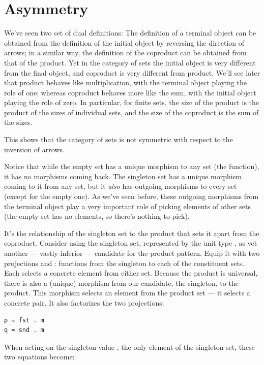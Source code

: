 \section{Asymmetry}\label{asymmetry}

We've seen two set of dual definitions: The definition of a terminal
object can be obtained from the definition of the initial object by
reversing the direction of arrows; in a similar way, the definition of
the coproduct can be obtained from that of the product. Yet in the
category of sets the initial object is very different from the final
object, and coproduct is very different from product. We'll see later
that product behaves like multiplication, with the terminal object
playing the role of one; whereas coproduct behaves more like the sum,
with the initial object playing the role of zero. In particular, for
finite sets, the size of the product is the product of the sizes of
individual sets, and the size of the coproduct is the sum of the sizes.

This shows that the category of sets is not symmetric with respect to
the inversion of arrows.

Notice that while the empty set has a unique morphism to any set (the
 function), it has no morphisms coming back. The
singleton set has a unique morphism coming to it from any set, but it
\emph{also} has outgoing morphisms to every set (except for the empty
one). As we've seen before, these outgoing morphisms from the terminal
object play a very important role of picking elements of other sets (the
empty set has no elements, so there's nothing to pick).

It's the relationship of the singleton set to the product that sets it
apart from the coproduct. Consider using the singleton set, represented
by the unit type \code{()}, as yet another --- vastly inferior ---
candidate for the product pattern. Equip it with two projections
 and : functions from the singleton to each of the
constituent sets. Each selects a concrete element from either set.
Because the product is universal, there is also a (unique) morphism
 from our candidate, the singleton, to the product. This
morphism selects an element from the product set --- it selects a
concrete pair. It also factorizes the two projections:

\begin{Verbatim}[commandchars=\\\{\}]
p = fst . m
q = snd . m
\end{Verbatim}
When acting on the singleton value \code{()}, the only element of the
singleton set, these two equations become:

